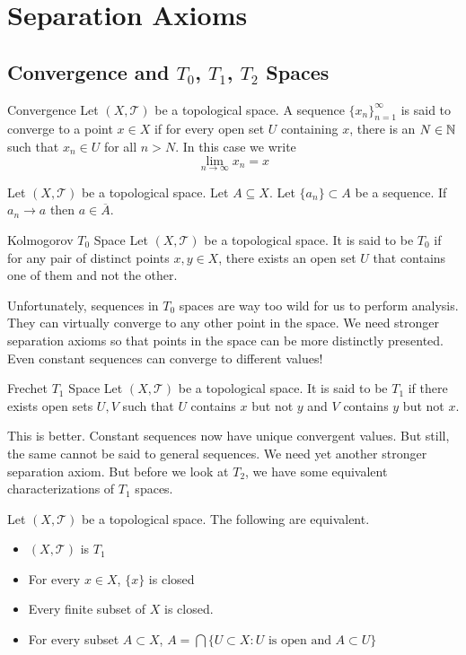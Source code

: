 \documentclass[a4paper]{article}
\begin{document}
\pagebreak
\section{Separation Axioms}
\subsection{Convergence and $T_0$, $T_1$, $T_2$ Spaces}
\begin{defn}{Convergence}{} Let $(X,\mathcal{T})$ be a topological space. A sequence $\{x_n\}_{n=1}^\infty$ is said to converge to a point $x\in X$ if for every open set $U$ containing $x$, there is an $N\in\mathbb{N}$ such that $x_n\in U$ for all $n>N$. In this case we write $$\lim_{n\to\infty}x_n=x$$
\end{defn}

\begin{prp}{}{} Let $(X,\mathcal{T})$ be a topological space. Let $A\subseteq X$. Let $\{a_n\}\subset A$ be a sequence. If $a_n\to a$ then $a\in\overline{A}$. 
\end{prp}

\begin{defn}{Kolmogorov $T_0$ Space}{} Let $(X,\mathcal{T})$ be a topological space. It is said to be $T_0$ if for any pair of distinct points $x,y\in X$, there exists an open set $U$ that contains one of them and not the other. 
\end{defn}

Unfortunately, sequences in $T_0$ spaces are way too wild for us to perform analysis. They can virtually converge to any other point in the space. We need stronger separation axioms so that points in the space can be more distinctly presented. Even constant sequences can converge to different values!

\begin{defn}{Frechet $T_1$ Space}{} Let $(X,\mathcal{T})$ be a topological space. It is said to be $T_1$ if there exists open sets $U,V$ such that $U$ contains $x$ but not $y$ and $V$ contains $y$ but not $x$. 
\end{defn}

This is better. Constant sequences now have unique convergent values. But still, the same cannot be said to general sequences. We need yet another stronger separation axiom. But before we look at $T_2$, we have some equivalent characterizations of $T_1$ spaces. 

\begin{prp}{}{} Let $(X,\mathcal{T})$ be a topological space. The following are equivalent. 
\begin{itemize}
\item $(X,\mathcal{T})$ is $T_1$
\item For every $x\in X$, $\{x\}$ is closed
\item Every finite subset of $X$ is closed. 
\item For every subset $A\subset X$, $A=\bigcap\{U\subset X:U\text{ is open and }A\subset U\}$
\end{itemize}
\end{prp}
\end{document}
